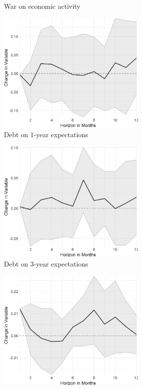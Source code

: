 \begin{figure}
\begin{subfigure}{00.24\textwidth}
		\caption{War on economic activity}
	\end{subfigure}
	\begin{subfigure}{00.24\textwidth}
		\includegraphics[width=0.8\textwidth]{output/lp/baseline/bHP/debt/debtonexpectations1y_djn.eps}
		\caption{Debt on 1-year expectations}
	\end{subfigure}
	\begin{subfigure}{00.24\textwidth}
		\includegraphics[width=0.8\textwidth]{output/lp/baseline/bHP/debt/debtonexpectations3y_djn.eps}
		\caption{Debt on 3-year expectations}
	\end{subfigure}
	\begin{subfigure}{00.24\textwidth}
		\includegraphics[width=0.8\textwidth]{output/lp/baseline/bHP/debt/debtoninflation_djn.eps}

\end{subfigure}
\end{figure}
